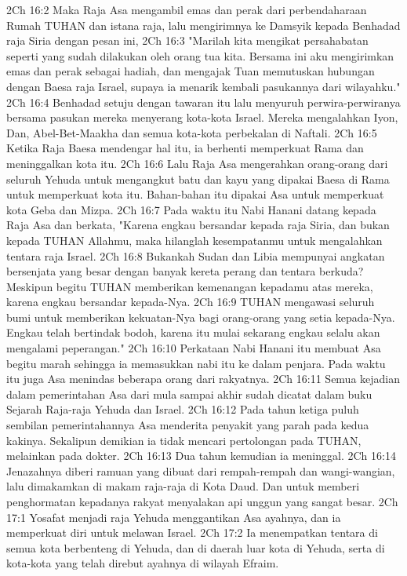 2Ch 16:2  Maka Raja Asa mengambil emas dan perak dari perbendaharaan Rumah TUHAN dan istana raja, lalu mengirimnya ke Damsyik kepada Benhadad raja Siria dengan pesan ini,
2Ch 16:3  "Marilah kita mengikat persahabatan seperti yang sudah dilakukan oleh orang tua kita. Bersama ini aku mengirimkan emas dan perak sebagai hadiah, dan mengajak Tuan memutuskan hubungan dengan Baesa raja Israel, supaya ia menarik kembali pasukannya dari wilayahku."
2Ch 16:4  Benhadad setuju dengan tawaran itu lalu menyuruh perwira-perwiranya bersama pasukan mereka menyerang kota-kota Israel. Mereka mengalahkan Iyon, Dan, Abel-Bet-Maakha dan semua kota-kota perbekalan di Naftali.
2Ch 16:5  Ketika Raja Baesa mendengar hal itu, ia berhenti memperkuat Rama dan meninggalkan kota itu.
2Ch 16:6  Lalu Raja Asa mengerahkan orang-orang dari seluruh Yehuda untuk mengangkut batu dan kayu yang dipakai Baesa di Rama untuk memperkuat kota itu. Bahan-bahan itu dipakai Asa untuk memperkuat kota Geba dan Mizpa.
2Ch 16:7  Pada waktu itu Nabi Hanani datang kepada Raja Asa dan berkata, "Karena engkau bersandar kepada raja Siria, dan bukan kepada TUHAN Allahmu, maka hilanglah kesempatanmu untuk mengalahkan tentara raja Israel.
2Ch 16:8  Bukankah Sudan dan Libia mempunyai angkatan bersenjata yang besar dengan banyak kereta perang dan tentara berkuda? Meskipun begitu TUHAN memberikan kemenangan kepadamu atas mereka, karena engkau bersandar kepada-Nya.
2Ch 16:9  TUHAN mengawasi seluruh bumi untuk memberikan kekuatan-Nya bagi orang-orang yang setia kepada-Nya. Engkau telah bertindak bodoh, karena itu mulai sekarang engkau selalu akan mengalami peperangan."
2Ch 16:10  Perkataan Nabi Hanani itu membuat Asa begitu marah sehingga ia memasukkan nabi itu ke dalam penjara. Pada waktu itu juga Asa menindas beberapa orang dari rakyatnya.
2Ch 16:11  Semua kejadian dalam pemerintahan Asa dari mula sampai akhir sudah dicatat dalam buku Sejarah Raja-raja Yehuda dan Israel.
2Ch 16:12  Pada tahun ketiga puluh sembilan pemerintahannya Asa menderita penyakit yang parah pada kedua kakinya. Sekalipun demikian ia tidak mencari pertolongan pada TUHAN, melainkan pada dokter.
2Ch 16:13  Dua tahun kemudian ia meninggal.
2Ch 16:14  Jenazahnya diberi ramuan yang dibuat dari rempah-rempah dan wangi-wangian, lalu dimakamkan di makam raja-raja di Kota Daud. Dan untuk memberi penghormatan kepadanya rakyat menyalakan api unggun yang sangat besar.
2Ch 17:1  Yosafat menjadi raja Yehuda menggantikan Asa ayahnya, dan ia memperkuat diri untuk melawan Israel.
2Ch 17:2  Ia menempatkan tentara di semua kota berbenteng di Yehuda, dan di daerah luar kota di Yehuda, serta di kota-kota yang telah direbut ayahnya di wilayah Efraim.
